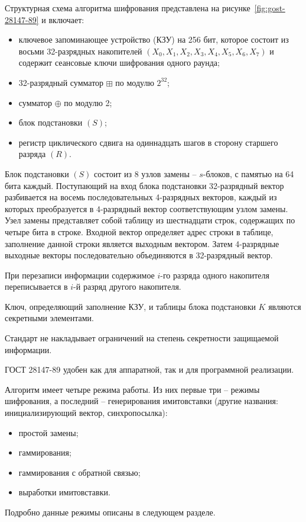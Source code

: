 Структурная схема алгоритма шифрования представлена на рисунке~\ref{fig:gost-28147-89} и включает:
\begin{itemize}
    \item ключевое запоминающее устройство (КЗУ) на 256 бит, которое состоит из восьми 32-разрядных накопителей $(X_0, X_1, X_2, X_3, X_4, X_5, X_6, X_7)$ и содержит сеансовые ключи шифрования одного раунда;
    \item 32-разрядный сумматор $\boxplus$ по модулю $2^{32}$;
    \item сумматор $\oplus$ по модулю 2;
    \item блок подстановки $(S)$;
    \item регистр циклического сдвига на одиннадцать шагов в сторону старшего разряда  $(R)$.
\end{itemize}

Блок подстановки $(S)$ состоит из 8 узлов замены -- $s$-блоков, с памятью на 64 бита каждый. Поступающий на вход блока подстановки 32-разрядный вектор разбивается на восемь последовательных 4-разрядных векторов, каждый из которых преобразуется в 4-разрядный вектор соответствующим узлом замены. Узел замены представляет собой таблицу из шестнадцати строк, содержащих по четыре бита в строке. Входной вектор определяет адрес строки в таблице, заполнение данной строки является выходным вектором. Затем 4-разрядные выходные векторы последовательно объединяются в 32-разрядный вектор.

При перезаписи информации содержимое $i$-го разряда одного накопителя переписывается в $i$-й разряд другого накопителя.

Ключ, определяющий заполнение КЗУ, и таблицы блока подстановки $K$ являются секретными элементами.

Стандарт не накладывает ограничений на степень секретности защищаемой информации.

ГОСТ 28147-89 удобен как для аппаратной, так и для программной реализации.

Алгоритм имеет четыре режима работы. Из них первые три -- режимы шифрования, а  последний -- генерирования имитовставки (другие названия: инициализирующий вектор, синхропосылка):
\begin{itemize}
    \item простой замены;
    \item гаммирования;
    \item гаммирования с обратной связью;
    \item выработки имитовставки.
\end{itemize}


Подробно данные режимы описаны в следующем разделе.

